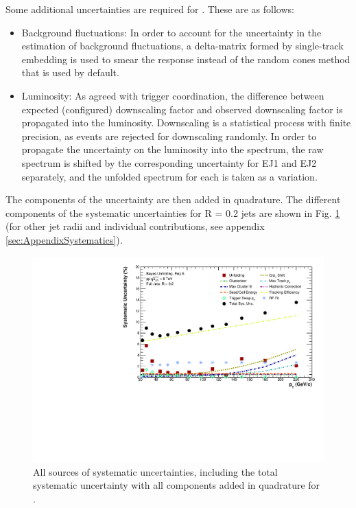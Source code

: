 Some additional uncertainties are required for \pPb. These are as follows:

\begin{itemize}
    \item Background fluctuations: In order to account for the uncertainty in the estimation of background fluctuations, a delta-\pT matrix formed by single-track embedding is used to smear the response instead of the random cones method that is used by default.
    \item Luminosity: As agreed with trigger coordination, the difference between expected (configured) downscaling factor and observed downscaling factor is propagated into the luminosity. Downscaling is a statistical process with finite precision, as events are rejected for downscaling randomly. In order to propagate the uncertainty on the luminosity into the spectrum, the raw spectrum is shifted by the corresponding uncertainty for EJ1 and EJ2 separately, and the unfolded spectrum for each is taken as a variation.
\end{itemize}

The components of the uncertainty are then added in quadrature. The different components of the systematic uncertainties for R = 0.2 jets are shown in Fig. \ref{fig:SystematicsSpectraR02} (for other jet radii and individual contributions, see appendix \ref{sec:AppendixSystematics}).

\begin{figure}
    \centering
    \includegraphics[width=15cm]{figures/Systematics/TotalSystematics_R02.pdf}
    \caption{All sources of systematic uncertainties, including the total systematic uncertainty with all components added in quadrature for \pp.}
    \label{fig:SystematicsSpectraR02}
\end{figure}

